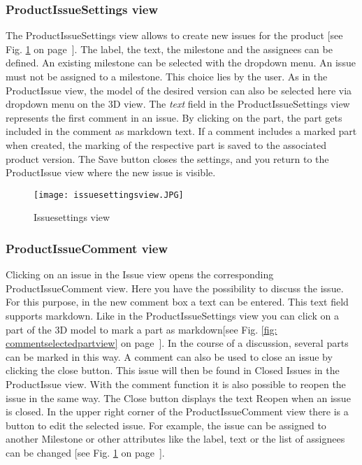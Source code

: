     \subsubsection*{ProductIssueSettings view}
    The ProductIssueSettings view allows to create new issues for the product [see Fig. \ref{fig: issuesettingsview} on page~\pageref{fig: issuesettingsview}]. The label, the text, the milestone and the assignees can be defined. An existing milestone can be selected with the dropdown menu. An issue must not be assigned to a milestone. This choice lies by the user. 
    As in the ProductIssue view, the model of the desired version can also be selected here via dropdown menu on the 3D view.
    The \textit{text} field in the ProductIssueSettings view represents the first comment in an issue. By clicking on the part, the part gets included in the comment as markdown text. If a comment includes a marked part when created, the marking of the respective part is saved to the associated product version.
    The Save button closes the settings, and you return to the ProductIssue view where the new issue is visible.

    \begin{figure}[h]
        \centering
        \texttt{[image: issuesettingsview.JPG]}
        \caption{Issuesettings view}
        \label{fig: issuesettingsview}
    \end{figure}

    \subsubsection*{ProductIssueComment view}
    Clicking on an issue in the Issue view opens the corresponding ProductIssueComment view.  Here you have the possibility to discuss the issue. 
    For this purpose, in the new comment box a text can be entered. This text field supports markdown.
    Like in the ProductIssueSettings view you can click on a part of the 3D model to mark a part as markdown[see Fig. \ref{fig: commentselectedpartview} on page~\pageref{fig: commentselectedpartview}]. In the course of a discussion, several parts can be marked in this way.
    A comment can also be used to close an issue by clicking the close button. This issue will then be found in Closed Issues in the ProductIssue view. With the comment function it is also possible to reopen the issue in the same way. The Close button displays the text Reopen when an issue is closed. In the upper right corner of the ProductIssueComment view there is a button to edit the selected issue. For example, the issue can be assigned to another Milestone or other attributes like the label, text or the list of assignees can be changed [see Fig. \ref{fig: issuesettingsview} on page~\pageref{fig: issuesettingsview}].

